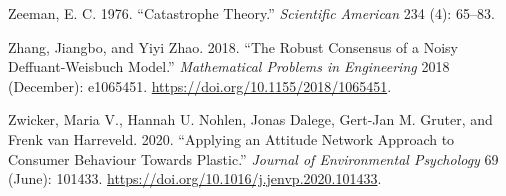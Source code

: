 \documentclass[
  a4paper,
  DIV=11,
  numbers=noendperiod,
  oneside]{scrreprt}
\newlength{\cslhangindent}
\newenvironment{CSLReferences}[2] %
 {\begin{list}{}{%
  \setlength{\itemindent}{0pt}
  \setlength{\leftmargin}{0pt}
  \setlength{\parsep}{0pt}
  \ifodd #1
   \setlength{\leftmargin}{\cslhangindent}
   \setlength{\itemindent}{-1\cslhangindent}
  \fi
  \setlength{\itemsep}{#2\baselineskip}}}
 {\end{list}}
\begin{document}
\begin{CSLReferences}{1}{0}
Zeeman, E. C. 1976. {``Catastrophe {Theory}.''} \emph{Scientific
American} 234 (4): 65--83.

Zhang, Jiangbo, and Yiyi Zhao. 2018. {``The {Robust Consensus} of a
{Noisy Deffuant-Weisbuch Model}.''} \emph{Mathematical Problems in
Engineering} 2018 (December): e1065451.
\url{https://doi.org/10.1155/2018/1065451}.

Zwicker, Maria V., Hannah U. Nohlen, Jonas Dalege, Gert-Jan M. Gruter,
and Frenk van Harreveld. 2020. {``Applying an Attitude Network Approach
to Consumer Behaviour Towards Plastic.''} \emph{Journal of Environmental
Psychology} 69 (June): 101433.
\url{https://doi.org/10.1016/j.jenvp.2020.101433}.

\end{CSLReferences}



\printindex
\end{document}
